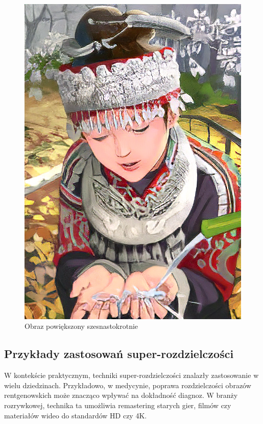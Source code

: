 \begin{figure}[ht]
\begin{minipage}[t]{0.3\linewidth}
        \includegraphics[width=\linewidth]{Rozdziały/02.Podstawy_teoretyczne/comic_ESRGAN_x16.png}
        \caption{Obraz powiększony szesnastokrotnie}
        \label{fig:image3}
    \end{minipage}
\end{figure}

\subsection*{Przykłady zastosowań super-rozdzielczości}

W kontekście praktycznym, techniki super-rozdzielczości znalazły zastosowanie w wielu dziedzinach. Przykładowo, w medycynie, poprawa rozdzielczości obrazów rentgenowskich może znacząco wpływać na dokładność diagnoz. W branży rozrywkowej, technika ta umożliwia remastering starych gier, filmów czy materiałów wideo do standardów HD czy 4K.

